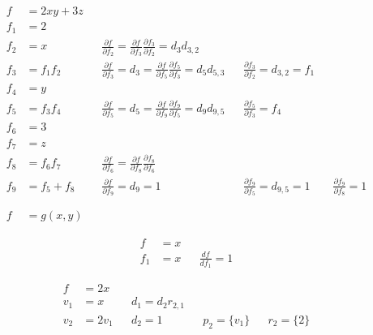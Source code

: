 \documentclass{article}
\begin{document}
\begin{align}
  f &= 2xy + 3z \\
  f_1 &= 2 \\
  f_2 &= x && \frac{\partial f}{\partial f_2} = \frac{\partial f}{\partial f_3} \frac{\partial f_3}{\partial f_2} = d_3 d_{3,2}\\
  f_3 &= f_1 f_2 && \frac{\partial f}{\partial f_3} = d_3 = \frac{\partial f}{\partial f_5} \frac{\partial f_5}{\partial f_3} = d_5 d_{5,3} && \frac{\partial f_3}{\partial f_2} = d_{3,2} = f_1\\
  f_4 &= y \\
  f_5 &= f_3 f_4 && \frac{\partial f}{\partial f_5} = d_5 = \frac{\partial f}{\partial f_9} \frac{\partial f_9}{\partial f_5} = d_9 d_{9,5} && \frac{\partial f_5}{\partial f_3} = f_4\\
  f_6 &= 3\\
  f_7 &= z\\
  f_8 &= f_6 f_7 && \frac{\partial f}{\partial f_6} = \frac{\partial f}{\partial f_8} \frac{\partial f_8}{\partial f_6}\\
  f_9 &= f_5 + f_8 && \frac{\partial f}{\partial f_9} = d_9 = 1 && \frac{\partial f_9}{\partial f_5} = d_{9,5} = 1 && \frac{\partial f_9}{\partial f_8} = 1 \\
  \\
  \\
  f &= g(x,y)
\end{align}

\clearpage

\begin{align}
  f &= x
  \\
  f_1 &= x
    && \frac{df}{df_1} = 1
\end{align}

\begin{align}
  f &= 2x
  \\
  v_1 &= x
    && d_1 = d_2 r_{2,1}
  \\
  v_2 &= 2v_1
    && d_2 = 1
    && p_2 = \{v_1\}
    && r_2 = \{2\}
\end{align}
\end{document}

